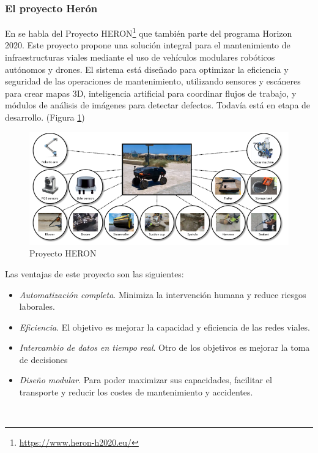 \subsubsection{El proyecto Herón}
\label{subsubsec:sistema2}

En \cite{10.1145/3529190.3534746} se habla del Proyecto HERON\footnote{\url{https://www.heron-h2020.eu/}} que también parte del programa Horizon 2020. Este proyecto propone una solución integral para el mantenimiento de infraestructuras viales mediante el uso de vehículos modulares robóticos autónomos y drones. El sistema está diseñado para optimizar la eficiencia y seguridad de las operaciones de mantenimiento, utilizando sensores y escáneres para crear mapas 3D, inteligencia artificial para coordinar flujos de trabajo, y módulos de análisis de imágenes para detectar defectos. Todavía está en etapa de desarrollo. (Figura \ref{fig:heron})


\begin{figure} [h!]
	\begin{center}
		\includegraphics[width=16cm]{figs/heron.png}
	\end{center}
	\caption{Proyecto HERON}
	\label{fig:heron}
\end{figure}

Las ventajas de este proyecto son las siguientes:

\begin{itemize}
	\item \textit{Automatización completa}. Minimiza la intervención humana y reduce riesgos laborales.
	\item \textit{Eficiencia}. El objetivo es mejorar la capacidad y eficiencia de las redes viales.
	\item \textit{Intercambio de datos en tiempo real}. Otro de los objetivos es mejorar la toma de decisiones
	\item \textit{Diseño modular}. Para poder maximizar sus capacidades, facilitar el transporte y reducir los costes de mantenimiento y accidentes.
\end{itemize}\

